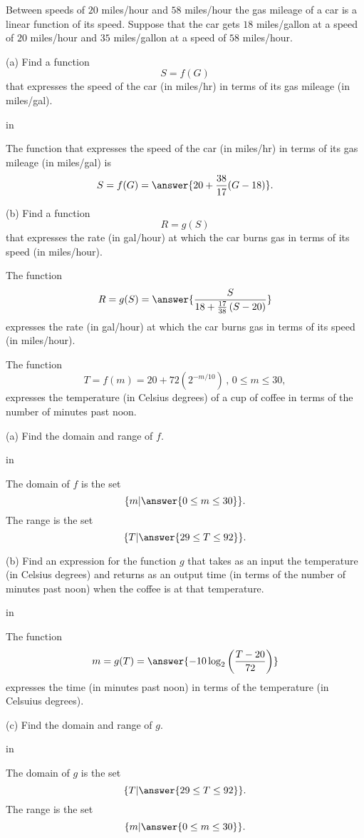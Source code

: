 \documentclass{ximera}
\newcommand{\pskip}{\vskip 0.1 in}
\begin{document}
\begin{question}  \label{Q99834322}
Between speeds of $20$ miles/hour and $58$ miles/hour the gas mileage of a car is a linear function of its speed. Suppose that the car gets $18$ miles/gallon at a speed of $20$ miles/hour and $35$ miles/gallon at a speed of $58$ miles/hour.

(a) Find a function 
\[
       S = f(G)
\]
that expresses the speed of the car (in miles/hr) in terms of its gas mileage (in miles/gal).

\pskip

The function that expresses the speed of the car (in miles/hr) in terms of its gas mileage (in miles/gal) is
\[
      S = f(G) = \answer{20 + \frac{38}{17}(G-18)} .
\]

(b) Find a function 
\[
   R = g(S)
\]
that expresses the rate (in gal/hour) at which the car burns gas in terms of its speed (in miles/hour).

The function
\[
        R = g(S) = \answer{\frac{S}{18+\frac{17}{38}\left(  S - 20  \right)}}
\]
expresses the rate (in gal/hour) at which the car burns gas in terms of its speed (in miles/hour).
\end{question}


\begin{question}  \label{QDFdf4444}
The function
\[
      T = f(m) = 20 + 72 (2^{-m/10}) \, , \, 0 \leq m \leq 30 ,
\]
expresses the temperature (in Celsius degrees) of a cup of coffee in terms of the number of minutes past noon.

(a) Find the domain and range of $f$.

\pskip

The domain of $f$ is the set
\[
     \{ m | \answer{0\leq m \leq 30}   \} .
\]
The range is the set
\[
       \{ T | \answer{29\leq T \leq 92}   \} .
\]


(b) Find an expression for the function $g$ that takes as an input the temperature (in Celsius degrees)  and returns as an output time (in terms of the number of minutes past noon) when the coffee is at that temperature.

\pskip

The function 
\[
         m = g(T) = \answer{-10 \log_2 \left( \frac{T-20}{72} \right)} 
\]
expresses the time (in minutes past noon) in terms of the temperature (in Celsuius degrees).

(c) Find the domain and range of $g$.

\pskip

The domain of $g$ is the set
\[
      \{ T | \answer{29\leq T \leq 92}   \} .
\]
The range is the set
\[
    \{ m | \answer{0\leq m \leq 30}   \} .  
\]

\end{question}
\end{document}
